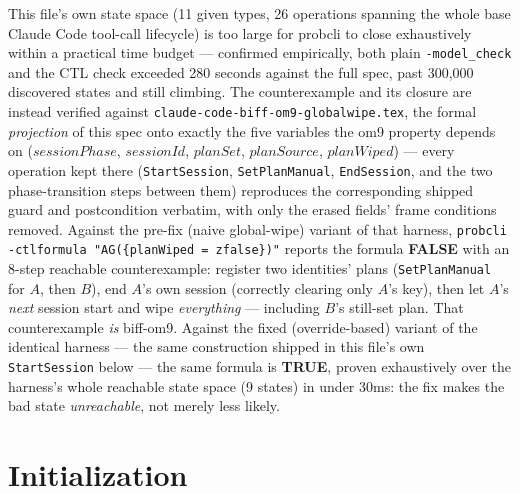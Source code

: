 \documentclass[a4paper,10pt,fleqn]{article}
\begin{document}
This file's own state space (11 given types, 26 operations spanning the
whole base Claude Code tool-call lifecycle) is too large for probcli to
close exhaustively within a practical time budget --- confirmed
empirically, both plain \texttt{-model\_check} and the CTL check exceeded
280 seconds against the full spec, past 300,000 discovered states and
still climbing.  The counterexample and its closure are instead verified
against \texttt{claude-code-biff-om9-globalwipe.tex}, the formal
\emph{projection} of this spec onto exactly the five variables the om9
property depends on ($sessionPhase$, $sessionId$, $planSet$,
$planSource$, $planWiped$) --- every operation kept there
(\texttt{StartSession}, \texttt{SetPlanManual}, \texttt{EndSession}, and
the two phase-transition steps between them) reproduces the corresponding
shipped guard and postcondition verbatim, with only the erased fields'
frame conditions removed.  Against the pre-fix (naive global-wipe)
variant of that harness, \texttt{probcli -ctlformula "AG(\{planWiped =
zfalse\})"} reports the formula \textbf{FALSE} with an 8-step reachable
counterexample: register two identities' plans (\texttt{SetPlanManual}
for $A$, then $B$), end $A$'s own session (correctly clearing only $A$'s
key), then let $A$'s \emph{next} session start and wipe \emph{everything}
--- including $B$'s still-set plan.  That counterexample \emph{is}
biff-om9.  Against the fixed (override-based) variant of the identical
harness --- the same construction shipped in this file's own
\texttt{StartSession} below --- the same formula is \textbf{TRUE},
proven exhaustively over the harness's whole reachable state space (9
states) in under 30ms: the fix makes the bad state \emph{unreachable},
not merely less likely.

\section{Initialization}
\end{document}
